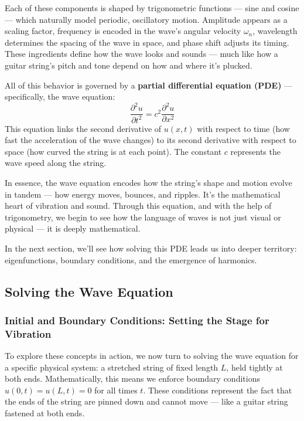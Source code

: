 Each of these components is shaped by trigonometric functions — sine and cosine — which naturally model periodic, oscillatory motion. Amplitude appears as a scaling factor, frequency is encoded in the wave’s angular velocity \( \omega_n \), wavelength determines the spacing of the wave in space, and phase shift adjusts its timing. These ingredients define how the wave looks and sounds — much like how a guitar string’s pitch and tone depend on how and where it’s plucked.

All of this behavior is governed by a \textbf{partial differential equation (PDE)} — specifically, the wave equation:
\[
\frac{\partial^2 u}{\partial t^2} = c^2 \frac{\partial^2 u}{\partial x^2}
\]
This equation links the second derivative of \( u(x, t) \) with respect to time (how fast the acceleration of the wave changes) to its second derivative with respect to space (how curved the string is at each point). The constant \( c \) represents the wave speed along the string.

In essence, the wave equation encodes how the string’s shape and motion evolve in tandem — how energy moves, bounces, and ripples. It’s the mathematical heart of vibration and sound. Through this equation, and with the help of trigonometry, we begin to see how the language of waves is not just visual or physical — it is deeply mathematical.

In the next section, we’ll see how solving this PDE leads us into deeper territory: eigenfunctions, boundary conditions, and the emergence of harmonics.
















\subsection{Solving the Wave Equation}

\subsubsection{Initial and Boundary Conditions: Setting the Stage for Vibration}

To explore these concepts in action, we now turn to solving the wave equation for a specific physical system: a stretched string of fixed length \( L \), held tightly at both ends. Mathematically, this means we enforce boundary conditions \( u(0,t) = u(L,t) = 0 \) for all times \( t \). These conditions represent the fact that the ends of the string are pinned down and cannot move — like a guitar string fastened at both ends.

